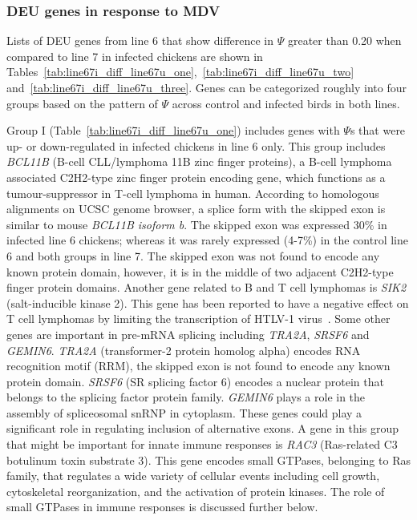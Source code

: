 \documentclass[10pt]{article}
\begin{document}
\subsubsection*{DEU genes in response to MDV}

Lists of DEU genes from line 6 that show difference in $\Psi$ greater than 0.20 when compared to line 7
in infected chickens are shown in
Tables~\ref{tab:line67i_diff_line67u_one},~\ref{tab:line67i_diff_line67u_two}
and~\ref{tab:line67i_diff_line67u_three}.
Genes can be categorized roughly into four groups based on the pattern of $\Psi$ across control and
infected birds in both lines.

Group I (Table~\ref{tab:line67i_diff_line67u_one}) includes genes with $\Psi$s that were
up- or down-regulated in infected chickens in line 6 only.
This group includes \textit{BCL11B} (B-cell CLL/lymphoma 11B zinc finger proteins), a B-cell lymphoma
associated C2H2-type zinc finger protein encoding gene, which functions as a tumour-suppressor
in T-cell lymphoma in human.
According to homologous alignments on UCSC genome browser, a splice form with the skipped exon
is similar to mouse \textit{BCL11B isoform b}.
The skipped exon was expressed 30\% in infected line 6 chickens; whereas it was rarely expressed
(4-7\%) in the control line 6 and both groups in line 7.
The skipped exon was not found to encode any known protein domain, however, it is in the middle of
two adjacent C2H2-type finger protein domains.
Another gene related to B and T cell lymphomas is \textit{SIK2} (salt-inducible kinase 2).
This gene has been reported to have a negative effect on T cell lymphomas by limiting the transcription of
HTLV-1 virus~\cite{tang2013lkb1}.
Some other genes are important in pre-mRNA splicing including \textit{TRA2A},
\textit{SRSF6} and \textit{GEMIN6}.
\textit{TRA2A} (transformer-2 protein homolog alpha) encodes RNA recognition motif (RRM),
the skipped exon is not found to encode any known protein domain.
\textit{SRSF6} (SR splicing factor 6) encodes a nuclear protein that belongs to the splicing
factor protein family.
\textit{GEMIN6} plays a role in the assembly of spliceosomal snRNP in cytoplasm.
These genes could play a significant role in regulating inclusion of alternative exons.
A gene in this group that might be important for innate immune responses is \textit{RAC3} (Ras-related C3
botulinum toxin substrate 3).
This gene encodes small GTPases, belonging to Ras family, that regulates a wide variety of cellular events
including cell growth, cytoskeletal reorganization, and the activation of protein kinases.
The role of small GTPases in immune responses is discussed further below.
\end{document}
